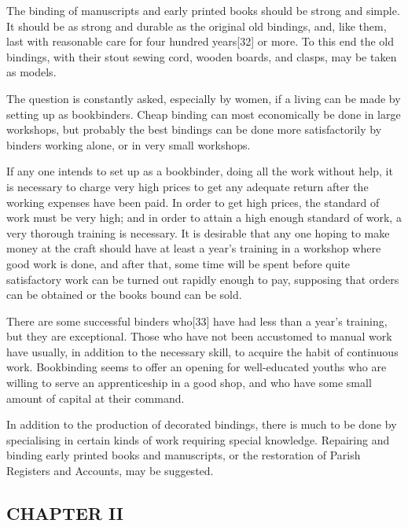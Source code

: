 \documentclass[
]{article}
\begin{document}
The binding of manuscripts and early printed books should be strong and
simple. It should be as strong and durable as the original old bindings,
and, like them, last with reasonable care for four hundred
years{\protect\hypertarget{Page_32}{}{{[}32{]}}} or more. To this end
the old bindings, with their stout sewing cord, wooden boards, and
clasps, may be taken as models.

The question is constantly asked, especially by women, if a living can
be made by setting up as bookbinders. Cheap binding can most
economically be done in large workshops, but probably the best bindings
can be done more satisfactorily by binders working alone, or in very
small workshops.

If any one intends to set up as a bookbinder, doing all the work without
help, it is necessary to charge very high prices to get any adequate
return after the working expenses have been paid. In order to get high
prices, the standard of work must be very high; and in order to attain a
high enough standard of work, a very thorough training is necessary. It
is desirable that any one hoping to make money at the craft should have
at least a year's training in a workshop where good work is done, and
after that, some time will be spent before quite satisfactory work can
be turned out rapidly enough to pay, supposing that orders can be
obtained or the books bound can be sold.

There are some successful binders
who{\protect\hypertarget{Page_33}{}{{[}33{]}}} have had less than a
year's training, but they are exceptional. Those who have not been
accustomed to manual work have usually, in addition to the necessary
skill, to acquire the habit of continuous work. Bookbinding seems to
offer an opening for well-educated youths who are willing to serve an
apprenticeship in a good shop, and who have some small amount of capital
at their command.

In addition to the production of decorated bindings, there is much to be
done by specialising in certain kinds of work requiring special
knowledge. Repairing and binding early printed books and manuscripts, or
the restoration of Parish Registers and Accounts, may be suggested.

\hypertarget{chapter-ii}{%
\subsection[CHAPTER
II]{\texorpdfstring{\protect\hypertarget{CHAPTER_II}{}{}CHAPTER
II}{CHAPTER II}}\label{chapter-ii}}
\end{document}
